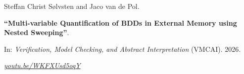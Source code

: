 Steffan Christ Sølvsten and Jaco van de Pol.

{\bf ``Multi-variable Quantification of BDDs in External Memory using Nested Sweeping''}.

In: \emph{Verification, Model Checking, and Abstract Interpretation} (VMCAI).
2026.

\medskip

\qquad
\href{https://youtu.be/WKFXUsd5oqY}{\emph{youtu.be/WKFXUsd5oqY}}

\label{cite:2026.vmcai}
